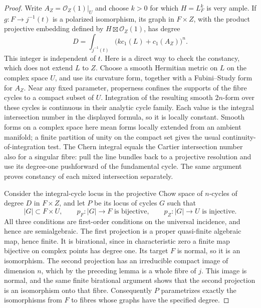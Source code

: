 \begin{proof}
Write $A_Z=\mathcal O_Z(1)|_U$ and choose $k>0$ for which
$H=L_F^k$ is very ample.  If $g:F\to j^{-1}(t)$ is a polarized
isomorphism, its graph in $F\times Z$, with the product projective
embedding defined by $H\boxtimes\mathcal O_Z(1)$, has degree
\begin{equation}
 D=\int_{j^{-1}(t)}
                \bigl(kc_1(L)+c_1(A_Z)\bigr)^n.
 \label{cmp:graph-degree}
\end{equation}
This integer is independent of $t$.  Here is a direct way to check
the constancy, which does not extend $L$ to $Z$.  Choose a smooth
Hermitian metric on $L$ on the complex space $U$, and use its
curvature form, together with a Fubini--Study form for $A_Z$.  Near
any fixed parameter, properness confines the supports of the fibre
cycles to a compact subset of $U$.  Integration of the resulting
smooth $2n$-form over these cycles is continuous in their analytic
cycle family.  Each value is the integral intersection number in
the displayed formula, so it is locally constant.  Smooth forms on
a complex space here mean forms locally extended from an ambient
manifold; a finite partition of unity on the compact set gives the
usual continuity-of-integration test.  The Chern integral equals the
Cartier intersection number also for a singular fibre: pull the
line bundles back to a projective resolution and use its degree-one
pushforward of the fundamental cycle.  The same argument proves
constancy of each mixed intersection separately.

Consider the integral-cycle locus in the projective Chow space of
$n$-cycles of degree $D$ in $F\times Z$, and let $P$ be its locus of
cycles $G$ such that
\[
 |G|\subset F\times U,\qquad
 p_F:|G|\to F\text{ is bijective},\qquad
 p_Z:|G|\to U\text{ is injective}.
\]
All three conditions are first-order conditions on the universal
incidence, and hence are semialgebraic.  The first projection is a
proper quasi-finite algebraic map, hence finite.  It is birational,
since in characteristic zero a finite map bijective on complex
points has degree one.  Its target $F$ is normal, so it is an
isomorphism.  The second projection has an irreducible compact image
of dimension $n$, which by the preceding lemma is a whole fibre of
$j$.  This image is normal, and the same finite birational argument
shows that the second projection is an isomorphism onto that fibre.
Consequently $P$ parametrizes exactly the isomorphisms from $F$ to
fibres whose graphs have the specified degree.


\end{proof}
